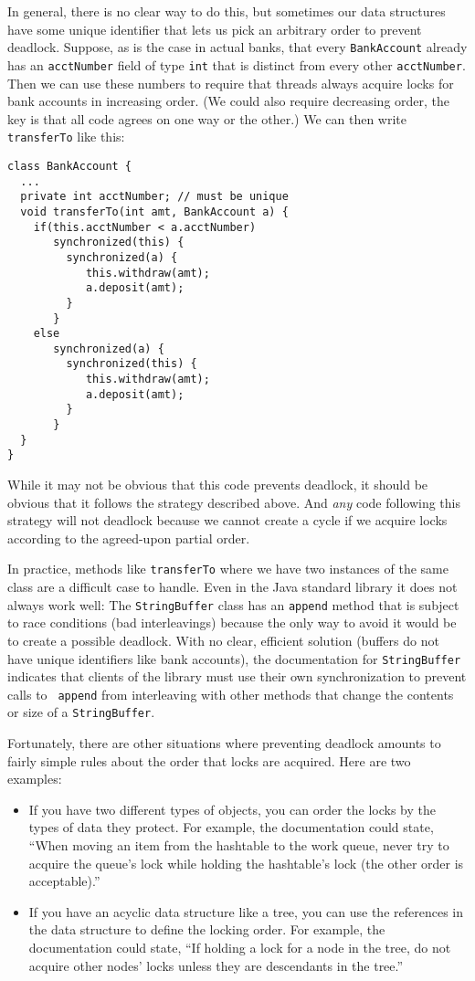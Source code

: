 \documentclass[10pt]{article}
\begin{document}
In general, there is no clear way to do this, but sometimes our data
structures have some unique identifier that lets us pick an arbitrary
order to prevent deadlock.  Suppose, as is the case in actual banks,
that every {\tt BankAccount} already has an {\tt acctNumber} field of type
{\tt int} that is distinct from every other {\tt acctNumber}.  Then we
can use these numbers to require that threads always acquire locks for
bank accounts in increasing order.  (We could also require decreasing
order, the key is that all code agrees on one way or the other.)  We
can then write {\tt transferTo} like this:
\begin{verbatim}
class BankAccount {
  ...
  private int acctNumber; // must be unique
  void transferTo(int amt, BankAccount a) {
    if(this.acctNumber < a.acctNumber)
       synchronized(this) {
         synchronized(a) {
            this.withdraw(amt);
            a.deposit(amt);
         }
       }
    else
       synchronized(a) {
         synchronized(this) {
            this.withdraw(amt);
            a.deposit(amt);
         }
       }
  }
}
\end{verbatim}
While it may not be obvious that this code prevents deadlock, it
should be obvious that it follows the strategy described above.  And
\emph{any} code following this strategy will not deadlock because we cannot
create a cycle if we acquire locks according to the agreed-upon
partial order.

In practice, methods like {\tt transferTo} where we have two instances
of the same class are a difficult case to handle.  Even in the Java
standard library it does not always work well: The {\tt StringBuffer}
class has an {\tt append} method that is subject to race conditions
(bad interleavings) because the only way to avoid it would be to
create a possible deadlock.  With no clear, efficient solution
(buffers do not have unique identifiers like bank accounts), the
documentation for {\tt StringBuffer} indicates that clients of the
library must use their own synchronization to prevent calls to {\tt
  append} from interleaving with other methods that change the
contents or size of a {\tt StringBuffer}.

Fortunately, there are other situations where preventing deadlock
amounts to fairly simple rules about the order that locks are
acquired.  Here are two examples:
\begin{itemize}
\item If you have two different types of objects, you can order the
  locks by the types of data they protect.  For example, the
  documentation could state, ``When moving an item from the hashtable
  to the work queue, never try to acquire the queue's lock while
  holding the hashtable's lock (the other order is acceptable).''
\item If you have an acyclic data structure like a tree, you can use
  the references in the data structure to define the locking order.
  For example, the documentation could state, ``If holding a lock for
  a node in the tree, do not acquire other nodes' locks unless they
  are descendants in the tree.''  
\end{itemize}
\end{document}
